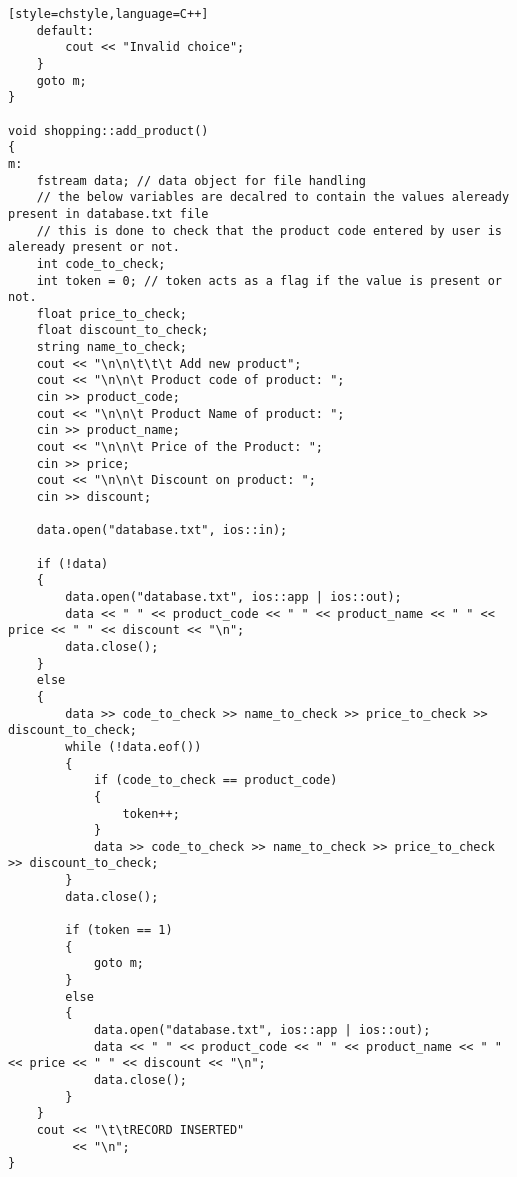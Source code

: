 \documentclass{article}
\begin{document}
\begin{verbatim}[style=chstyle,language=C++]
    default:
        cout << "Invalid choice";
    }
    goto m;
}

void shopping::add_product()
{
m:
    fstream data; // data object for file handling
    // the below variables are decalred to contain the values aleready present in database.txt file
    // this is done to check that the product code entered by user is aleready present or not.
    int code_to_check;
    int token = 0; // token acts as a flag if the value is present or not.
    float price_to_check;
    float discount_to_check;
    string name_to_check;
    cout << "\n\n\t\t\t Add new product";
    cout << "\n\n\t Product code of product: ";
    cin >> product_code;
    cout << "\n\n\t Product Name of product: ";
    cin >> product_name;
    cout << "\n\n\t Price of the Product: ";
    cin >> price;
    cout << "\n\n\t Discount on product: ";
    cin >> discount;

    data.open("database.txt", ios::in);

    if (!data)
    {
        data.open("database.txt", ios::app | ios::out);
        data << " " << product_code << " " << product_name << " " << price << " " << discount << "\n";
        data.close();
    }
    else
    {
        data >> code_to_check >> name_to_check >> price_to_check >> discount_to_check;
        while (!data.eof())
        {
            if (code_to_check == product_code)
            {
                token++;
            }
            data >> code_to_check >> name_to_check >> price_to_check >> discount_to_check;
        }
        data.close();

        if (token == 1)
        {
            goto m;
        }
        else
        {
            data.open("database.txt", ios::app | ios::out);
            data << " " << product_code << " " << product_name << " " << price << " " << discount << "\n";
            data.close();
        }
    }
    cout << "\t\tRECORD INSERTED"
         << "\n";
}


\end{verbatim}
\end{document}

